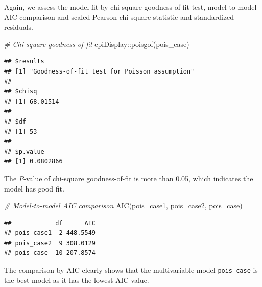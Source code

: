 \documentclass[
  10pt,
]{krantz}
\newenvironment{Shaded}{\begin{snugshade}}{\end{snugshade}}
\newcommand{\AttributeTok}[1]{\textcolor[rgb]{0.77,0.63,0.00}{#1}}
\newcommand{\CommentTok}[1]{\textcolor[rgb]{0.56,0.35,0.01}{\textit{#1}}}
\newcommand{\FunctionTok}[1]{\textcolor[rgb]{0.00,0.00,0.00}{#1}}
\newcommand{\NormalTok}[1]{#1}
\newcommand{\OtherTok}[1]{\textcolor[rgb]{0.56,0.35,0.01}{#1}}
\newcommand{\SpecialCharTok}[1]{\textcolor[rgb]{0.00,0.00,0.00}{#1}}
\newcommand{\StringTok}[1]{\textcolor[rgb]{0.31,0.60,0.02}{#1}}
\begin{document}
Again, we assess the model fit by chi-square goodness-of-fit test, model-to-model AIC comparison and scaled Pearson chi-square statistic and standardized residuals.

\begin{Shaded}
\begin{Highlighting}[]
\CommentTok{\# Chi{-}square goodness{-}of{-}fit}
\NormalTok{epiDisplay}\SpecialCharTok{::}\FunctionTok{poisgof}\NormalTok{(pois\_case)}
\end{Highlighting}
\end{Shaded}

\begin{verbatim}
## $results
## [1] "Goodness-of-fit test for Poisson assumption"
## 
## $chisq
## [1] 68.01514
## 
## $df
## [1] 53
## 
## $p.value
## [1] 0.0802866
\end{verbatim}

The \emph{P}-value of chi-square goodness-of-fit is more than 0.05, which indicates the model has good fit.

\begin{Shaded}
\begin{Highlighting}[]
\CommentTok{\# Model{-}to{-}model AIC comparison}
\FunctionTok{AIC}\NormalTok{(pois\_case1, pois\_case2, pois\_case)}
\end{Highlighting}
\end{Shaded}

\begin{verbatim}
##            df      AIC
## pois_case1  2 448.5549
## pois_case2  9 308.0129
## pois_case  10 207.8574
\end{verbatim}

The comparison by AIC clearly shows that the multivariable model \texttt{pois\_case} is the best model as it has the lowest AIC value.

\begin{Shaded}
\end{Shaded}
\end{document}
